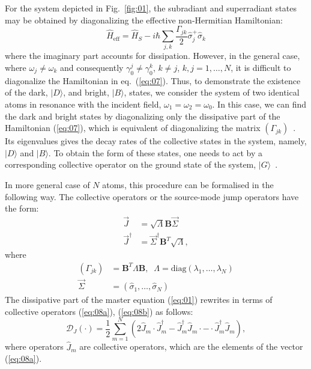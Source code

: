 \documentclass[aps,prl,twocolumn,superscriptaddress,showpacs,amsmath,amssymb]{revtex4-2}
\begin{document}
For the system depicted in Fig.~\ref{fig:01}, the subradiant and superradiant states may be obtained by diagonalizing the effective non-Hermitian Hamiltonian:
\begin{equation} 
    \hat{H}_\mathrm{eff} = \hat{H}_S - i \hbar \sum_{j,k} \frac{\Gamma_{jk}}{2} \hat{\sigma}_j^+ \hat{\sigma}_k
    \label{eq:07}
\end{equation}
where the imaginary part accounts for dissipation.
However, in the general case, where $\omega_j \neq \omega_k$ and consequently $\gamma_0^j \neq \gamma_0^k$, $k \neq j$, $k,j = 1,\ldots, N$, it is difficult to diagonalize the Hamiltonian in eq.~(\ref{eq:07}).
Thus, to demonstrate the existence of the dark, $|D\rangle$, and bright, $|B\rangle$, states, we consider the system of two identical atoms in resonance with the incident field, $\omega_1 = \omega_2 = \omega_0$.
In this case, we can find the dark and bright states by diagonalizing only the dissipative part of the Hamiltonian (\ref{eq:07}), which is equivalent of diagonalizing the matrix $\left( \Gamma_{jk} \right)$~\cite{gross1982superradiance,carmichael2000quantum,clemens2003collective}.
Its eigenvalues gives the decay rates of the collective states in the system, namely, $|D\rangle$ and $|B\rangle$.
To obtain the form of these states, one needs to act by a corresponding collective operator on the ground state of the system, $|G\rangle$~\cite{carmichael2000quantum,clemens2003collective}.

In more general case of $N$ atoms, this procedure can be formalised in the following way. 
The collective operators or the source-mode jump operators have the form:
\begin{align}
    \vec{J} &= \sqrt{\Lambda} \mathbf{B} \vec{\Sigma} \label{eq:08a} \\
    \vec{J}^\dagger &= \vec{\Sigma}^\dagger \mathbf{B}^T \sqrt{\Lambda},
    \label{eq:08b}
\end{align}
where 
\begin{align}
    \left(\Gamma_{jk}\right) &= \mathbf{B}^T \Lambda \mathbf{B}, \;\; 
    \Lambda = \mathrm{diag}\left(\lambda_1, \ldots, \lambda_N \right) \\ 
    \vec{\Sigma} &= \left( \hat{\sigma}_1, \ldots, \hat{\sigma}_N \right)
    \label{eq:09}
\end{align}
The dissipative part of the master equation (\ref{eq:01}) rewrites in terms of collective operators (\ref{eq:08a}), (\ref{eq:08b}) as follows:
\begin{equation}
    \mathcal{D}_J(\cdot) = \frac{1}{2} \sum_{m=1}^N \left( 2 \hat{J}_m \cdot \hat{J}_m^\dagger - \hat{J}_m^\dagger \hat{J}_m \cdot - \cdot \hat{J}_m^\dagger \hat{J}_m \right),
    \label{eq:10}
\end{equation}
where operators $\hat{J}_m$ are collective operators, which are the elements of the vector (\ref{eq:08a}).
\end{document}
